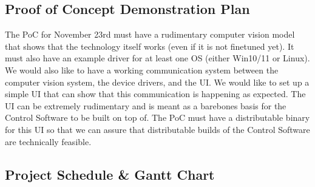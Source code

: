\documentclass{article}
\begin{document}
\subsection{Proof of Concept Demonstration Plan}

The PoC for November 23rd must have a rudimentary computer vision model that shows that the technology itself works (even if it is not finetuned yet). It must also have an example driver for at least one OS (either Win10/11 or Linux). We would also like to have a working communication system between the computer vision system, the device drivers, and the UI. We would like to set up a simple UI that can show that this communication is happening as expected. The UI can be extremely rudimentary and is meant as a barebones basis for the Control Software to be built on top of. The PoC must have a distributable binary for this UI so that we can assure that distributable builds of the Control Software are technically feasible.

\subsection{Project Schedule \& Gantt Chart}
\end{document}
